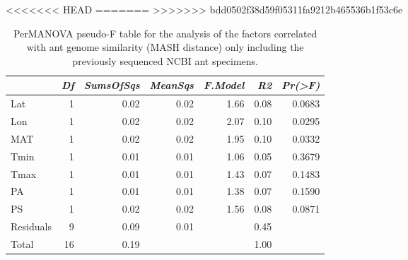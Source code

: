 <<<<<<< HEAD
=======
>>>>>>> bdd0502f38d59f05311fa9212b465536b1f53c6e
\begin{table}[ht]
\centering
\begin{tabular}{lrrrrrr}
  \hline
 & {\emph{Df}} & {\emph{SumsOfSqs}} & {\emph{MeanSqs}} & {\emph{F.Model}} & {\emph{R2}} & {\emph{Pr(>F)}} \\ 
  \hline
Lat & 1 & 0.02 & 0.02 & 1.66 & 0.08 & 0.0683 \\ 
  Lon & 1 & 0.02 & 0.02 & 2.07 & 0.10 & 0.0295 \\ 
  MAT & 1 & 0.02 & 0.02 & 1.95 & 0.10 & 0.0332 \\ 
  Tmin & 1 & 0.01 & 0.01 & 1.06 & 0.05 & 0.3679 \\ 
  Tmax & 1 & 0.01 & 0.01 & 1.43 & 0.07 & 0.1483 \\ 
  PA & 1 & 0.01 & 0.01 & 1.38 & 0.07 & 0.1590 \\ 
  PS & 1 & 0.02 & 0.02 & 1.56 & 0.08 & 0.0871 \\ 
  Residuals & 9 & 0.09 & 0.01 &  & 0.45 &  \\ 
  Total & 16 & 0.19 &  &  & 1.00 &  \\ 
   \hline
\end{tabular}
\caption{PerMANOVA pseudo-F table for the analysis of the factors 
correlated with ant genome similarity (MASH distance) only including the 
previously sequenced NCBI ant specimens.} 
\label{tab:perm_mash_napg}
\end{table}
